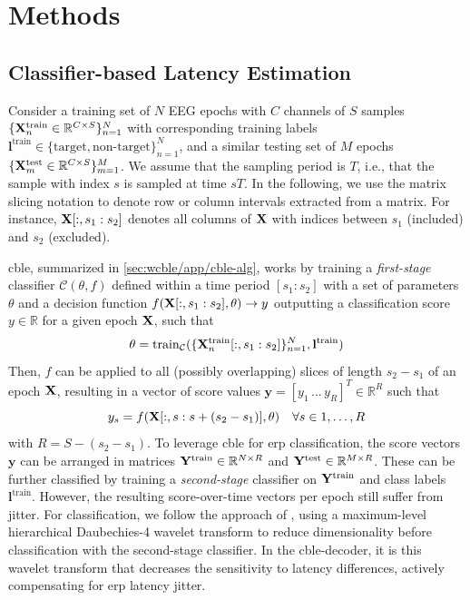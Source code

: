 \section{Methods}
\label{sec:wcble/methods}

\subsection{Classifier-based Latency Estimation}
\label{sec:wcble/methods/cble}

Consider a training set of $N$ EEG epochs with $C$ channels of $S$
samples $\{\mathbf{X}_n^\mathrm{train} \in \mathbb{R}^{C\times S}\}_{n=1}^N$
with corresponding training labels $\mathbf{l^\mathrm{train}} \in \{\mathrm{target},
	\textrm{non-target}\}_{n=1}^N$, and a
similar testing set of $M$ epochs $\{\mathbf{X}_m^\mathrm{test} \in
	\mathbb{R}^{C\times S}\}_{m=1}^M$.
We assume that the sampling period is $T$, i.e., that the sample with index $s$ is sampled at time $sT$.
In the following, we use the matrix slicing notation to denote row or column intervals extracted from a matrix.
For instance, $\mathbf{X}[:,s_1:s_2]$ denotes all columns of $\mathbf{X}$ with indices between $s_1$ (included) and $s_2$ (excluded).

\Ac{cble}, summarized in \cref{sec:wcble/app/cble-alg}, works by training a
\textit{first-stage} classifier $\mathcal{C}(\theta,f)$
defined within a time period $[s_1:s_2]$ with a set of parameters $\theta$ and a
decision function $f(\mathbf{X}[:,s_1:s_2],\theta) \rightarrow
y$ outputting a classification score $y\in\mathbb{R}$ for a given epoch $\mathbf{X}$,
such that
\begin{equation}
  \theta = \mathrm{train}_\mathcal{C}(\{\mathbf{X}_n^\mathrm{train}[:,s_1:s_2]\}_{n=1}^N,\mathbf{l}^\mathrm{train})
  \label{eq:cble-train}
\end{equation}
Then,
$f$ can be applied to all (possibly overlapping) slices of length $s_2-s_1$ of
an epoch $\mathbf{X}$, resulting in a vector of score values
$\mathbf{y}=[y_1\,\ldots\,y_R]^T \in\mathbb{R}^R$ such that
\begin{equation}
  y_s = f(\mathbf{X}[:,s:s+(s_2-s_1)],\theta)\quad \forall s\in 1,\ldots,R
	\label{eq:score}
\end{equation}
with $R = S-(s_2-s_1)$.
To leverage \ac{cble} for \ac{erp} classification, the score vectors $\mathbf{y}$ can be
arranged in matrices $\mathbf{Y}^\mathrm{train}\in\mathbb{R}^{N\times R}$ and $\mathbf{Y}^\mathrm{test}\in\mathbb{R}^{M\times R}$.
These can be further classified by training a \textit{second-stage} classifier on
$\mathbf{Y}^\mathrm{train}$ and class labels $\mathbf{l}^\mathrm{train}$.
However, the resulting score-over-time vectors per epoch still suffer from jitter.
For classification, we follow the approach of \textcite{Mowla2017}, using a
maximum-level hierarchical Daubechies-4 wavelet transform to reduce
dimensionality before classification with the second-stage classifier.
In the \ac{cble}-decoder, it is this wavelet transform that decreases the sensitivity
to latency differences, actively compensating for \ac{erp} latency jitter.

